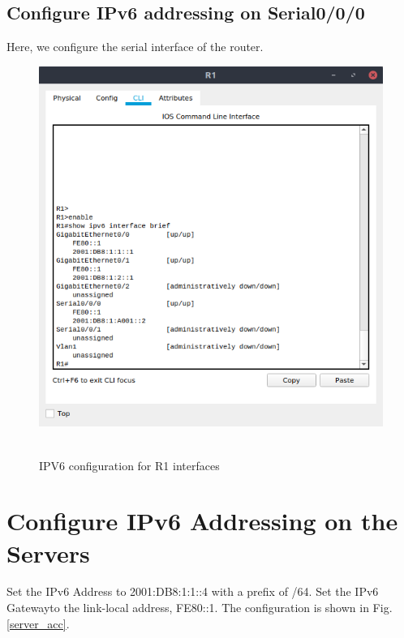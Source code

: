 \documentclass[conference]{IEEEtran}
\begin{document}
\subsection{Configure IPv6 addressing on Serial0/0/0}
Here, we configure the serial interface of the router.

\begin{center}
\begin{figure}[h]
\includegraphics[scale=0.45]{resources/q1.png}\
\caption{IPV6 configuration for R1 interfaces}
\label{router}
\end{figure}
\end{center}

\section{Configure IPv6 Addressing on the Servers}
Set the IPv6 Address to 2001:DB8:1:1::4 with a prefix of /64. Set the IPv6 Gatewayto the link-local address, FE80::1. The configuration is shown in Fig. \ref{server_acc}.
\end{document}
